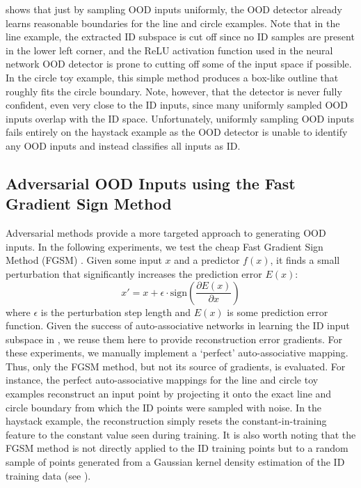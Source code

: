 \noindent {} shows that just by sampling OOD inputs uniformly, the OOD detector already learns reasonable boundaries for the line and circle examples. Note that in the line example, the extracted ID subspace is cut off since no ID samples are present in the lower left corner, and the ReLU activation function used in the neural network OOD detector is prone to cutting off some of the input space if possible. In the circle toy example, this simple method produces a box-like outline that roughly fits the circle boundary. Note, however, that the detector is never fully confident, even very close to the ID inputs, since many uniformly sampled OOD inputs overlap with the ID space. Unfortunately, uniformly sampling OOD inputs fails entirely on the haystack example as the OOD detector is unable to identify any OOD inputs and instead classifies all inputs as ID.

\subsection{Adversarial OOD Inputs using the Fast Gradient Sign Method} \label{txt:adversarial-ood-synthesis-analysis}

Adversarial methods provide a more targeted approach to generating OOD inputs. In the following experiments, we test the cheap Fast Gradient Sign Method (FGSM) \cite{fast-gradient-2014}. Given some input $x$ and a predictor $f(x)$, it finds a small perturbation that significantly increases the prediction error $E(x)$:
\begin{equation*}
    x' = x + \epsilon \cdot \text{sign} \left( \frac{\partial E(x)}{\partial x} \right)
\end{equation*}
where $\epsilon$ is the perturbation step length and $E(x)$ is some prediction error function. Given the success of auto-associative networks in learning the ID input subspace in , we reuse them here to provide reconstruction error gradients. For these experiments, we manually implement a `perfect' auto-associative mapping. Thus, only the FGSM method, but not its source of gradients, is evaluated. For instance, the perfect auto-associative mappings for the line and circle toy examples reconstruct an input point by projecting it onto the exact line and circle boundary from which the ID points were sampled with noise. In the haystack example, the reconstruction simply resets the constant-in-training feature to the constant value seen during training. It is also worth noting that the FGSM method is not directly applied to the ID training points but to a random sample of points generated from a Gaussian kernel density estimation of the ID training data (see ).

